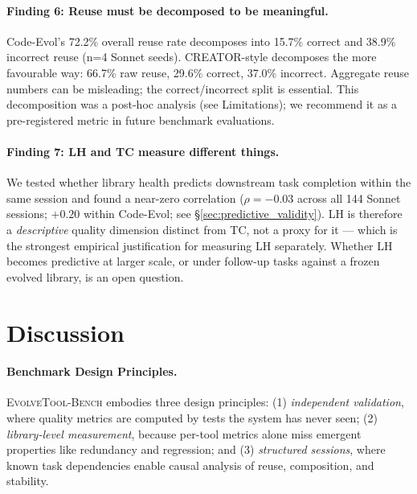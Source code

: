 \documentclass[sigplan,nonacm,natbib=false]{acmart}
\begin{document}
\paragraph{Finding 6: Reuse must be decomposed to be meaningful.} Code-Evol's 72.2\% overall reuse rate decomposes into 15.7\% correct and 38.9\% incorrect reuse (n=4 Sonnet seeds). CREATOR-style decomposes the more favourable way: 66.7\% raw reuse, 29.6\% correct, 37.0\% incorrect. Aggregate reuse numbers can be misleading; the correct/incorrect split is essential. This decomposition was a post-hoc analysis (see Limitations); we recommend it as a pre-registered metric in future benchmark evaluations.

\paragraph{Finding 7: LH and TC measure different things.} We tested whether library health predicts downstream task completion within the same session and found a near-zero correlation ($\rho = -0.03$ across all 144 Sonnet sessions; $+0.20$ within Code-Evol; see \S\ref{sec:predictive_validity}). LH is therefore a \emph{descriptive} quality dimension distinct from TC, not a proxy for it --- which is the strongest empirical justification for measuring LH separately. Whether LH becomes predictive at larger scale, or under follow-up tasks against a frozen evolved library, is an open question.

\section{Discussion}

\paragraph{Benchmark Design Principles.} \textsc{EvolveTool-Bench} embodies three design principles: (1) \emph{independent validation}, where quality metrics are computed by tests the system has never seen; (2) \emph{library-level measurement}, because per-tool metrics alone miss emergent properties like redundancy and regression; and (3) \emph{structured sessions}, where known task dependencies enable causal analysis of reuse, composition, and stability.
\end{document}
